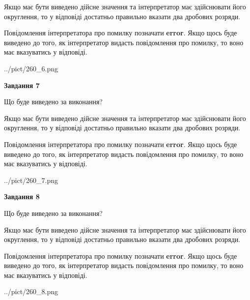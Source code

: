 \documentclass[12pt, ukrainian]{article}
\begin{document}
{\begin {Large}
Якщо має бути виведено дійсне значення та інтерпретатор має здійснювати його округлення, 
то у відповіді достатньо правильно вказати два дробових розряди.

Повідомлення інтерпретатора про помилку позначати \textbf{error}.
Якщо щось буде виведено до того, як інтерпретатор видасть повідомлення про помилку, 
то воно має вказуватись у відповіді. \par

\begin{center}
	{../pict/260_6.png}
\end{center}
\newpage

{\begin {center}\textbf{Завдання 7}\end {center}}\par
Що буде виведено за виконання? \par

Якщо має бути виведено дійсне значення та інтерпретатор має здійснювати його округлення, 
то у відповіді достатньо правильно вказати два дробових розряди.

Повідомлення інтерпретатора про помилку позначати \textbf{error}.
Якщо щось буде виведено до того, як інтерпретатор видасть повідомлення про помилку, 
то воно має вказуватись у відповіді. \par

\begin{center}
	{../pict/260_7.png}
\end{center}
\newpage

{\begin {center}\textbf{Завдання 8}\end {center}}\par
Що буде виведено за виконання? \par

Якщо має бути виведено дійсне значення та інтерпретатор має здійснювати його округлення, 
то у відповіді достатньо правильно вказати два дробових розряди.

Повідомлення інтерпретатора про помилку позначати \textbf{error}.
Якщо щось буде виведено до того, як інтерпретатор видасть повідомлення про помилку, 
то воно має вказуватись у відповіді. \par

\begin{center}
	{../pict/260_8.png}
\end{center}
\newpage


\end{Large}}
\end{document}

